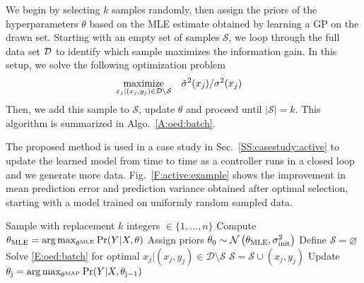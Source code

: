We begin by selecting \(k\) samples randomly, %
then assign the priors of the hyperparameters \(\theta\) based on the MLE estimate obtained by learning a GP on the drawn set.
Starting with an empty set of samples \(\mathcal{S}\), %
we loop through the full data set \(\mathcal{D}\) to identify which sample maximizes the information gain. In this setup, we solve the following optimization problem
\begin{align}
\label{E:oed:batch}
\maximize_{x_{j}|(x_j,y_j) \in \mathcal{D} \setminus \mathcal{S}} & \ \ \ \tilde{\sigma}^2(x_j)/{\sigma}^2(x_j) 
\end{align}
Then, we add this sample to \(\mathcal{S}\), update \(\theta\) and proceed until \(|\mathcal{S}|=k\).
This algorithm is summarized in Algo.~\ref{A:oed:batch}. 

The proposed method is used in a case study in Sec.~\ref{SS:casestudy:active} to update the learned model from time to time as a controller runs in a closed loop and we generate more data.
Fig.~\ref{F:active:example} shows the improvement in mean prediction error and prediction variance obtained after optimal selection, starting with a model trained on uniformly random sampled data. %

\begin{algorithm}[!tb]
	\caption{Optimal subset of data selection}
	\label{A:oed:batch}
	\begin{algorithmic}[1]
		\State Sample with replacement \(k\) integers \( \in \{1,\dots,n\} \)
		\State Compute \( \theta_{\mathrm{MLE}} = \operatorname*{arg\,max}_{\theta^{\mathrm{MLE}}} \Pr(Y \vert X, \theta)\)
		\State Assign priors \(\theta_{\mathrm{0}} \sim \operatorname*{\mathcal{N}}\left(\theta_{\mathrm{MLE}}, \sigma^2_{\mathrm{init}}\right)\)
		\EndProcedure
		\State Define \(\mathcal{S} = \varnothing\)
		\State Solve \eqref{E:oed:batch} for optimal \({x_{j} \vert (x_j,y_j) \in \mathcal{D} \setminus \mathcal{S}} \)
		\State \(\mathcal{S} = \mathcal{S} \cup (x_j,y_j) \)
		\State Update \( \theta_{\mathrm{j}} = \operatorname*{arg\,max}_{\theta^{\mathrm{MAP}}} \Pr(Y \vert X, \theta_{\mathrm{j-1}})\)
		\EndWhile
		\EndProcedure
	\end{algorithmic}
\end{algorithm}

\begin{figure*}[t]
	\centering
	\setlength{} 
	\setlength{}
	 \hspace{0.5cm}
	
	\caption{Left: Selection using random sampling. Right: Optimal subset of data selection. Starting with the random sampling, we use the model parameters and apply Algo.~\ref{A:oed:batch} to improve the model accuracy. Both the mean prediction error and the prediction variance are lower for optimal selection based on information gain. }
	\captionsetup{justification=centering}
	\label{F:active:example}
\end{figure*}


